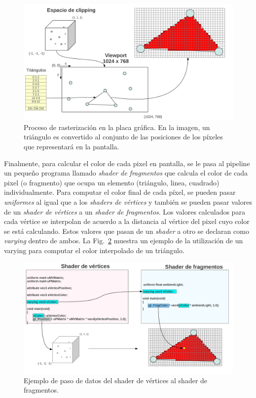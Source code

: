 \begin{figure}[h]
\begin{center}
\includegraphics[width=13cm]{figures/raster}
\end{center}
\caption[Proceso de rasterización en la placa gráfica]{Proceso de rasterización en la placa gráfica. En la imagen, un triángulo es convertido al conjunto de las posiciones de los píxeles que representará en la pantalla.}
\label{fg:raster}
\end{figure}

Finalmente, para calcular el color de cada pixel en pantalla, se le pasa al pipeline un pequeño programa llamado \emph{shader de fragmentos} que calcula el color de cada pixel (o fragmento) que ocupa un elemento (triángulo, linea, cuadrado) individualmente.
Para computar el color final de cada píxel, se pueden pasar \emph{uniformes} al igual que a los \emph{shaders de vértices} y también se pueden pasar valores de un \emph{shader de vértices} a un \emph{shader de fragmentos}.
Los valores calculados para cada vértice se interpolan de acuerdo a la distancia al vértice del pixel cuyo color se está calculando.
Estos valores que pasan de un \emph{shader} a otro se declaran como \emph{varying} dentro de ambos.
La Fig.~\ref{fg:fragmentshader} muestra un ejemplo de la utilización de un varying para computar el color interpolado de un triángulo.


\begin{figure}[h]
\begin{center}
\includegraphics[width=13cm]{figures/fragmentshader}
\end{center}
\caption{Ejemplo de paso de datos del shader de vértices al shader de fragmentos.}
\label{fg:fragmentshader}
\end{figure}

